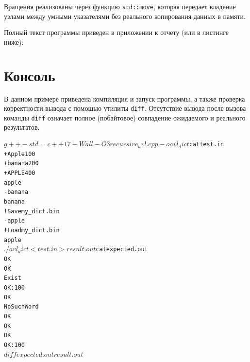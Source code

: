 Вращения реализованы через функцию \texttt{std::move}, которая передает владение узлами между умными указателями без реального копирования данных в памяти.

Полный текст программы приведен в приложении к отчету (или в листинге ниже):


\pagebreak

\section{Консоль}
В данном примере приведена компиляция и запуск программы, а также проверка корректности вывода с помощью утилиты \texttt{diff}. Отсутствие вывода после вызова команды \texttt{diff} означает полное (побайтовое) совпадение ожидаемого и реального результатов.

\begin{alltt}
$ g++ -std=c++17 -Wall -O3 recursive_avl.cpp -o avl_dict
$ cat test.in
+ Apple 100
+ banana 200
+ APPLE 400
apple
- banana
banana
! Save my_dict.bin
- apple
! Load my_dict.bin
apple
$ ./avl_dict < test.in > result.out
$ cat expected.out
OK
OK
Exist
OK: 100
OK
NoSuchWord
OK
OK
OK
OK: 100
$ diff expected.out result.out
$ 
\end{alltt}
\pagebreak
